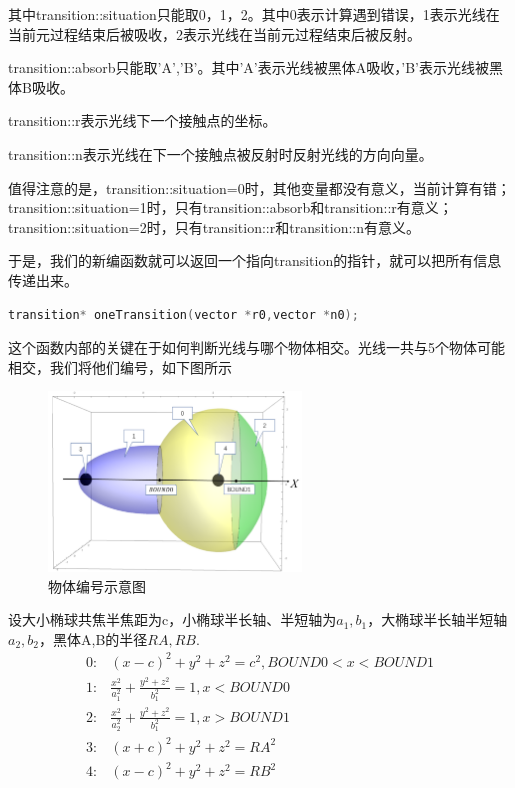 \documentclass[10pt, a4paper]{article}
\begin{document}
    其中transition::situation只能取0，1，2。其中0表示计算遇到错误，1表示光线在当前元过程结束后被吸收，2表示光线在当前元过程结束后被反射。

    transition::absorb只能取'A','B'。其中'A'表示光线被黑体A吸收，'B'表示光线被黑体B吸收。

    transition::r表示光线下一个接触点的坐标。

    transition::n表示光线在下一个接触点被反射时反射光线的方向向量。

    值得注意的是，transition::situation=0时，其他变量都没有意义，当前计算有错；transition::situation=1时，只有transition::absorb和transition::r有意义；transition::situation=2时，只有transition::r和transition::n有意义。

    于是，我们的新编函数就可以返回一个指向transition的指针，就可以把所有信息传递出来。

    \begin{lstlisting}[language=C]
        transition* oneTransition(vector *r0,vector *n0);
    \end{lstlisting}

    这个函数内部的关键在于如何判断光线与哪个物体相交。光线一共与5个物体可能相交，我们将他们编号，如下图所示

    \begin{figure}[H]
        \centering
        \includegraphics[width=0.6\textwidth]{物体编号示意图.png}
        \caption{物体编号示意图}\label{fig:物体编号示意图}
    \end{figure}

    设大小椭球共焦半焦距为c，小椭球半长轴、半短轴为$a_1,b_1$，大椭球半长轴半短轴$a_2,b_2$，黑体A,B的半径$RA,RB$.
    \begin{align*}
        0:&(x-c)^2+y^2+z^2=c^2,BOUND0<x<BOUND1\\
        1:&\frac{x^2}{a_1^2}+\frac{y^2+z^2}{b_1^2}=1,x<BOUND0\\
        2:&\frac{x^2}{a_2^2}+\frac{y^2+z^2}{b_1^2}=1,x>BOUND1\\
        3:&(x+c)^2+y^2+z^2=RA^2\\
        4:&(x-c)^2+y^2+z^2=RB^2
    \end{align*}
\end{document}
